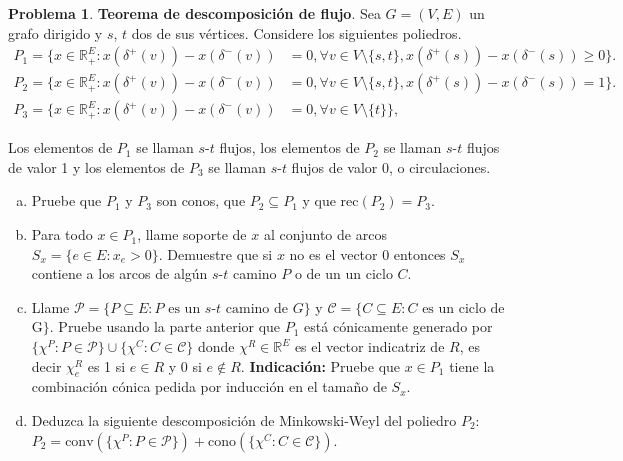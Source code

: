 \documentclass{article}
\newcommand{\RR}{\mathbb R}
\theoremstyle{plain}
\theoremstyle{definition}
\newtheorem{prob}[teo]{Problema}
\theoremstyle{Azul}
\begin{document}
\begin{prob} \textbf{Teorema de descomposición de flujo}. Sea $G=(V,E)$ un grafo dirigido y $s$, $t$ dos de sus vértices.
Considere los siguientes poliedros.
\begin{align*}
P_1=\{x\in \RR^E_{+}\colon
x(\delta^+(v))-x(\delta^- (v))&=0, \forall v\in V\setminus \{s,t\}, x(\delta^+(s))-x(\delta^- (s))\geq0\}.\\
P_2=\{x\in \RR^E_{+}\colon
x(\delta^+(v))-x(\delta^- (v))&=0, \forall v\in V\setminus \{s,t\},
x(\delta^+(s))-x(\delta^- (s))=1\}.\\
P_3=\{x\in \RR^E_{+}\colon
x(\delta^+(v))-x(\delta^- (v))&=0, \forall v\in V\setminus \{t\}\},
\end{align*}

Los elementos de $P_1$ se llaman $s$-$t$ flujos, los elementos de $P_2$ se llaman $s$-$t$ flujos de valor 1 y los elementos de $P_3$ se llaman $s$-$t$ flujos de valor 0, o circulaciones.

\begin{enumerate}[(a)]
\item Pruebe que $P_1$ y $P_3$ son conos, que $P_2\subseteq P_1$ y que $\text{rec}(P_2)=P_3$.
\item Para todo $x\in P_{1}$, llame soporte de $x$ al conjunto de arcos $S_x=\{e\in E\colon x_e>0\}$. Demuestre que si $x$ no es el vector 0 entonces $S_x$ contiene a los arcos de algún $s$-$t$ camino $P$ o de un un ciclo $C$.
\item Llame $\mathcal{P}=\{P\subseteq E\colon \text{$P$ es un $s$-$t$ camino de $G$}\}$ y $\mathcal{C}=\{C\subseteq E\colon \text{$C$ es un ciclo de } $G$\}$. Pruebe usando la parte anterior que $P_1$ está cónicamente generado por $\{\chi^P\colon P\in \mathcal{P}\}\cup \{\chi^C\colon C\in \mathcal{C}\}$ donde $\chi^R\in \RR^E$ es el vector indicatriz de $R$, es decir $\chi^R_e$ es 1 si $e\in R$ y 0 si $e\not\in R$. \textbf{Indicación:} Pruebe que $x\in P_1$ tiene la combinación cónica pedida por inducción en el tamaño de $S_x$.
\item Deduzca la siguiente descomposición de Minkowski-Weyl del poliedro $P_2$:\\
$P_2=\text{conv}(\{\chi^P\colon P\in \mathcal{P}\}) + \text{cono}(\{\chi^C\colon C\in \mathcal{C}\})$.
\end{enumerate}
\end{prob}
\end{document}
